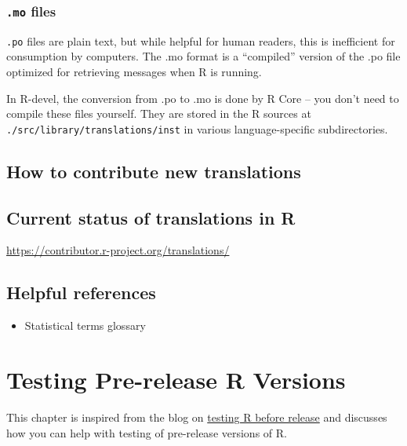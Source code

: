 \documentclass[
]{book}
\providecommand{\tightlist}{%
  \setlength{\itemsep}{0pt}\setlength{\parskip}{0pt}}
\begin{document}
\hypertarget{mo-files}{%
\subsection{\texorpdfstring{\texttt{.mo} files}{.mo files}}\label{mo-files}}

\texttt{.po} files are plain text, but while helpful for human readers, this is inefficient for consumption by computers.
The .mo format is a ``compiled'' version of the .po file optimized for retrieving messages when R is running.

In R-devel, the conversion from .po to .mo is done by R Core -- you don't need to compile these files yourself.
They are stored in the R sources at \texttt{./src/library/translations/inst} in various language-specific subdirectories.

\hypertarget{how-to-contribute-new-translations}{%
\section{How to contribute new translations}\label{how-to-contribute-new-translations}}

\hypertarget{current-status-of-translations-in-r}{%
\section{Current status of translations in R}\label{current-status-of-translations-in-r}}

\url{https://contributor.r-project.org/translations/}

\hypertarget{helpful-references}{%
\section{Helpful references}\label{helpful-references}}

\begin{itemize}
\tightlist
\item
  Statistical terms glossary
\end{itemize}

\hypertarget{TestRVer}{%
\chapter{Testing Pre-release R Versions}\label{TestRVer}}

This chapter is inspired from the blog on \href{https://blog.r-project.org/2021/04/28/r-can-use-your-help-testing-r-before-release/index.html}{testing R before release} and discusses how you can help with testing of pre-release versions of R.
\end{document}
